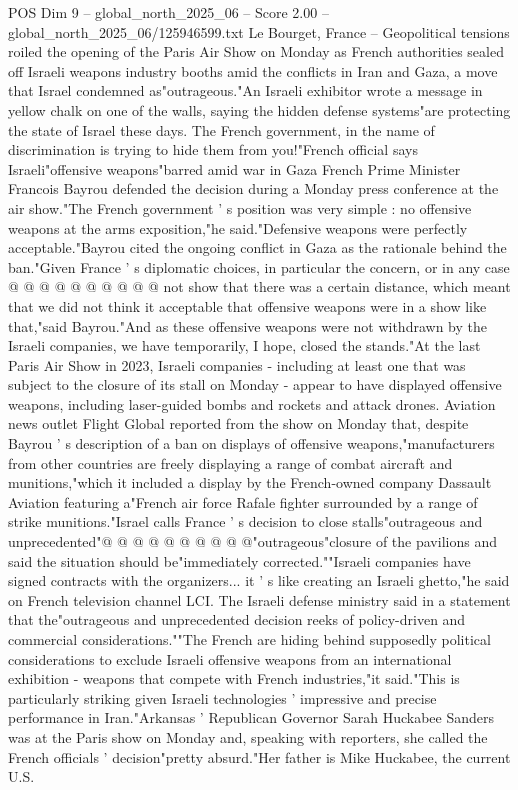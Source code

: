 \begin{textsample}{POS Dim 9 – global\_north\_2025\_06 – Score 2.00 – global\_north\_2025\_06/125946599.txt}  \label{ex:f9_pos_346}
Le Bourget, France -- Geopolitical tensions roiled the opening of the Paris Air Show on Monday as French authorities sealed off Israeli weapons industry booths amid the conflicts in Iran and Gaza, a move that Israel condemned as"outrageous."An Israeli exhibitor wrote a message in yellow chalk on one of the walls, saying the hidden defense systems"are protecting the state of Israel these days.
The French government, in the name of discrimination is trying to hide them from you!"French official says Israeli"offensive weapons"barred amid war in Gaza French Prime Minister Francois Bayrou defended the decision during a Monday press conference at the air show."The French government ' s position was very simple : no offensive weapons at the arms exposition,"he said."Defensive weapons were perfectly acceptable."Bayrou cited the ongoing conflict in Gaza as the rationale behind the ban."Given France ' s diplomatic choices, in particular the concern, or in any case @ @ @ @ @ @ @ @ @ @ not show that there was a certain distance, which meant that we did not think it acceptable that offensive weapons were in a show like that,"said Bayrou."And as these offensive weapons were not withdrawn by the Israeli companies, we have temporarily, I hope, closed the stands."At the last Paris Air Show in 2023, Israeli companies - including at least one that was subject to the closure of its stall on Monday - appear to have displayed offensive weapons, including laser-guided bombs and rockets and attack drones.
Aviation news outlet Flight Global reported from the show on Monday that, despite Bayrou ' s description of a ban on displays of offensive weapons,"manufacturers from other countries are freely displaying a range of combat aircraft and munitions,"which it included a display by the French-owned company Dassault Aviation featuring a"French air force Rafale fighter surrounded by a range of strike munitions."Israel calls France ' s decision to close stalls"outrageous and unprecedented"@ @ @ @ @ @ @ @ @ @"outrageous"closure of the pavilions and said the situation should be"immediately corrected.""Israeli companies have signed contracts with the organizers... it ' s like creating an Israeli ghetto,"he said on French television channel LCI.
The Israeli defense ministry said in a statement that the"outrageous and unprecedented decision reeks of policy-driven and commercial considerations.""The French are hiding behind supposedly political considerations to exclude Israeli offensive weapons from an international exhibition - weapons that compete with French industries,"it said."This is particularly striking given Israeli technologies ' impressive and precise performance in Iran."Arkansas ' Republican Governor Sarah Huckabee Sanders was at the Paris show on Monday and, speaking with reporters, she called the French officials ' decision"pretty absurd."Her father is Mike Huckabee, the current U.S.

\end{textsample}
